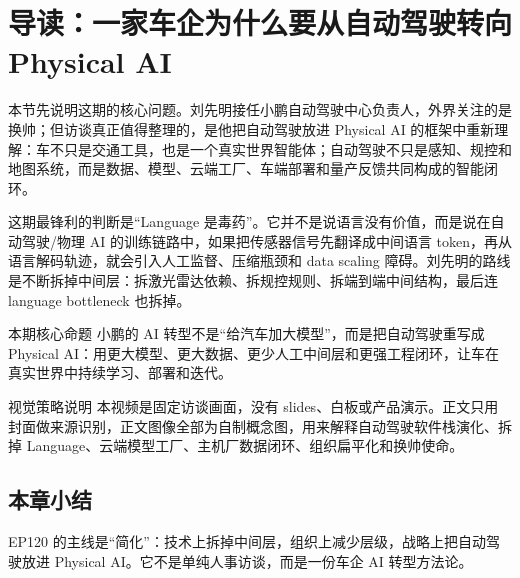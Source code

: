 \section{导读：一家车企为什么要从自动驾驶转向 Physical AI}

本节先说明这期的核心问题。刘先明接任小鹏自动驾驶中心负责人，外界关注的是换帅；但访谈真正值得整理的，是他把自动驾驶放进 Physical AI 的框架中重新理解：车不只是交通工具，也是一个真实世界智能体；自动驾驶不只是感知、规控和地图系统，而是数据、模型、云端工厂、车端部署和量产反馈共同构成的智能闭环。

这期最锋利的判断是“Language 是毒药”。它并不是说语言没有价值，而是说在自动驾驶/物理 AI 的训练链路中，如果把传感器信号先翻译成中间语言 token，再从语言解码轨迹，就会引入人工监督、压缩瓶颈和 data scaling 障碍。刘先明的路线是不断拆掉中间层：拆激光雷达依赖、拆规控规则、拆端到端中间结构，最后连 language bottleneck 也拆掉。

\begin{importantbox}{本期核心命题}
小鹏的 AI 转型不是“给汽车加大模型”，而是把自动驾驶重写成 Physical AI：用更大模型、更大数据、更少人工中间层和更强工程闭环，让车在真实世界中持续学习、部署和迭代。
\end{importantbox}

\begin{knowledgebox}{视觉策略说明}
本视频是固定访谈画面，没有 slides、白板或产品演示。正文只用封面做来源识别，正文图像全部为自制概念图，用来解释自动驾驶软件栈演化、拆掉 Language、云端模型工厂、主机厂数据闭环、组织扁平化和换帅使命。
\end{knowledgebox}

\subsection{本章小结}

EP120 的主线是“简化”：技术上拆掉中间层，组织上减少层级，战略上把自动驾驶放进 Physical AI。它不是单纯人事访谈，而是一份车企 AI 转型方法论。

